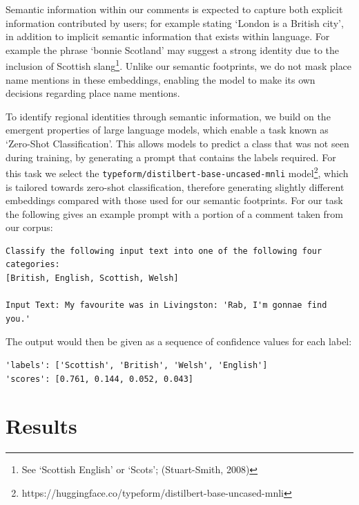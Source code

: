 \documentclass[
  letterpaper,
  11pt,
  english,
  onehalfspacing,
  headsepline]{MastersDoctoralThesis}
\begin{document}
Semantic information within our comments is expected to capture both
explicit information contributed by users; for example stating `London
is a British city', in addition to implicit semantic information that
exists within language. For example the phrase `bonnie Scotland' may
suggest a strong identity due to the inclusion of Scottish
slang\footnote{See `Scottish English' or `Scots'; (Stuart-Smith, 2008)}.
Unlike our semantic footprints, we do not mask place name mentions in
these embeddings, enabling the model to make its own decisions regarding
place name mentions.

To identify regional identities through semantic information, we build
on the emergent properties of large language models, which enable a task
known as `Zero-Shot Classification'. This allows models to predict a
class that was not seen during training, by generating a prompt that
contains the labels required. For this task we select the
\texttt{typeform/distilbert-base-uncased-mnli} model\footnote{https://huggingface.co/typeform/distilbert-base-uncased-mnli},
which is tailored towards zero-shot classification, therefore generating
slightly different embeddings compared with those used for our semantic
footprints. For our task the following gives an example prompt with a
portion of a comment taken from our corpus:

\begin{verbatim}
Classify the following input text into one of the following four categories:
[British, English, Scottish, Welsh]

Input Text: My favourite was in Livingston: 'Rab, I'm gonnae find you.'
\end{verbatim}

The output would then be given as a sequence of confidence values for
each label:

\begin{verbatim}
'labels': ['Scottish', 'British', 'Welsh', 'English']
'scores': [0.761, 0.144, 0.052, 0.043]
\end{verbatim}

\hypertarget{sec-results}{%
\section{Results}\label{sec-results}}
\end{document}
